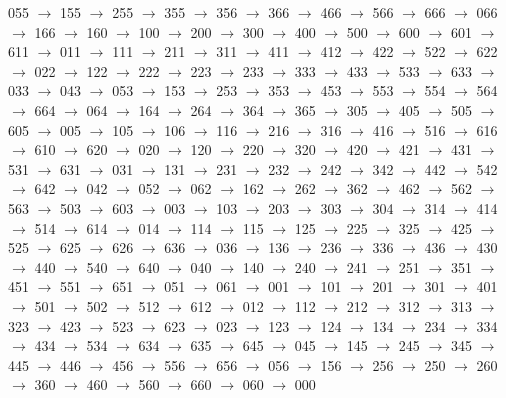 055 $\rightarrow$ 155 $\rightarrow$ 255 $\rightarrow$ 355 $\rightarrow$ 356 $\rightarrow$ 366 $\rightarrow$ 466 $\rightarrow$ 566 $\rightarrow$ 666 $\rightarrow$ 066 $\rightarrow$ 166 $\rightarrow$ 160 $\rightarrow$ 100 $\rightarrow$ 200 $\rightarrow$ 300 $\rightarrow$ 400 $\rightarrow$ 500 $\rightarrow$ 600 $\rightarrow$ 601 $\rightarrow$ 611 $\rightarrow$ 011 $\rightarrow$ 111 $\rightarrow$ 211 $\rightarrow$ 311 $\rightarrow$ 411 $\rightarrow$ 412 $\rightarrow$ 422 $\rightarrow$ 522 $\rightarrow$ 622 $\rightarrow$ 022 $\rightarrow$ 122 $\rightarrow$ 222 $\rightarrow$ 223 $\rightarrow$ 233 $\rightarrow$ 333 $\rightarrow$ 433 $\rightarrow$ 533 $\rightarrow$ 633 $\rightarrow$ 033 $\rightarrow$ 043 $\rightarrow$ 053 $\rightarrow$ 153 $\rightarrow$ 253 $\rightarrow$ 353 $\rightarrow$ 453 $\rightarrow$ 553 $\rightarrow$ 554 $\rightarrow$ 564 $\rightarrow$ 664 $\rightarrow$ 064 $\rightarrow$ 164 $\rightarrow$ 264 $\rightarrow$ 364 $\rightarrow$ 365 $\rightarrow$ 305 $\rightarrow$ 405 $\rightarrow$ 505 $\rightarrow$ 605 $\rightarrow$ 005 $\rightarrow$ 105 $\rightarrow$ 106 $\rightarrow$ 116 $\rightarrow$ 216 $\rightarrow$ 316 $\rightarrow$ 416 $\rightarrow$ 516 $\rightarrow$ 616 $\rightarrow$ 610 $\rightarrow$ 620 $\rightarrow$ 020 $\rightarrow$ 120 $\rightarrow$ 220 $\rightarrow$ 320 $\rightarrow$ 420 $\rightarrow$ 421 $\rightarrow$ 431 $\rightarrow$ 531 $\rightarrow$ 631 $\rightarrow$ 031 $\rightarrow$ 131 $\rightarrow$ 231 $\rightarrow$ 232 $\rightarrow$ 242 $\rightarrow$ 342 $\rightarrow$ 442 $\rightarrow$ 542 $\rightarrow$ 642 $\rightarrow$ 042 $\rightarrow$ 052 $\rightarrow$ 062 $\rightarrow$ 162 $\rightarrow$ 262 $\rightarrow$ 362 $\rightarrow$ 462 $\rightarrow$ 562 $\rightarrow$ 563 $\rightarrow$ 503 $\rightarrow$ 603 $\rightarrow$ 003 $\rightarrow$ 103 $\rightarrow$ 203 $\rightarrow$ 303 $\rightarrow$ 304 $\rightarrow$ 314 $\rightarrow$ 414 $\rightarrow$ 514 $\rightarrow$ 614 $\rightarrow$ 014 $\rightarrow$ 114 $\rightarrow$ 115 $\rightarrow$ 125 $\rightarrow$ 225 $\rightarrow$ 325 $\rightarrow$ 425 $\rightarrow$ 525 $\rightarrow$ 625 $\rightarrow$ 626 $\rightarrow$ 636 $\rightarrow$ 036 $\rightarrow$ 136 $\rightarrow$ 236 $\rightarrow$ 336 $\rightarrow$ 436 $\rightarrow$ 430 $\rightarrow$ 440 $\rightarrow$ 540 $\rightarrow$ 640 $\rightarrow$ 040 $\rightarrow$ 140 $\rightarrow$ 240 $\rightarrow$ 241 $\rightarrow$ 251 $\rightarrow$ 351 $\rightarrow$ 451 $\rightarrow$ 551 $\rightarrow$ 651 $\rightarrow$ 051 $\rightarrow$ 061 $\rightarrow$ 001 $\rightarrow$ 101 $\rightarrow$ 201 $\rightarrow$ 301 $\rightarrow$ 401 $\rightarrow$ 501 $\rightarrow$ 502 $\rightarrow$ 512 $\rightarrow$ 612 $\rightarrow$ 012 $\rightarrow$ 112 $\rightarrow$ 212 $\rightarrow$ 312 $\rightarrow$ 313 $\rightarrow$ 323 $\rightarrow$ 423 $\rightarrow$ 523 $\rightarrow$ 623 $\rightarrow$ 023 $\rightarrow$ 123 $\rightarrow$ 124 $\rightarrow$ 134 $\rightarrow$ 234 $\rightarrow$ 334 $\rightarrow$ 434 $\rightarrow$ 534 $\rightarrow$ 634 $\rightarrow$ 635 $\rightarrow$ 645 $\rightarrow$ 045 $\rightarrow$ 145 $\rightarrow$ 245 $\rightarrow$ 345 $\rightarrow$ 445 $\rightarrow$ 446 $\rightarrow$ 456 $\rightarrow$ 556 $\rightarrow$ 656 $\rightarrow$ 056 $\rightarrow$ 156 $\rightarrow$ 256 $\rightarrow$ 250 $\rightarrow$ 260 $\rightarrow$ 360 $\rightarrow$ 460 $\rightarrow$ 560 $\rightarrow$ 660 $\rightarrow$ 060 $\rightarrow$ 000 

